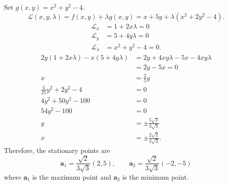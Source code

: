 \begin{solution}
    Set $g(x, y) = x^2 + y^2 - 4$.
    \[ \mathcal L(x, y, \lambda) = f(x, y) + \lambda g(x, y) =
    x + 5y + \lambda(x^2 + 2y^2 - 4). \]
    \begin{align*}
        \mathcal L_x       &= 1 + 2x\lambda = 0 \\
        \mathcal L_y       &= 5 + 4y\lambda = 0 \\
        \mathcal L_\lambda &= x^2 + y^2 - 4 = 0.
    \end{align*}
    \begin{align*}
        2y(1 + 2x\lambda) - x(5 + 4y\lambda) 
        &= 2y + 4xy\lambda - 5x - 4xy\lambda \\
        &= 2y - 5x = 0 \\ 
        x &= \frac25y \\
        \frac{4}{25}y^2 + 2y^2 - 4 &= 0 \\
        4y^2 + 50y^2 - 100 &= 0 \\
        54y^2 - 100 &= 0 \\
        y &= \pm \frac{5\sqrt2}{3\sqrt3} \\
        x &= \pm \frac{2\sqrt2}{3\sqrt3}.
    \end{align*}
    Therefore, the stationary points are
    \[ \bm a_1 = \frac{\sqrt2}{3\sqrt3}(2, 5), \qquad \bm a_2 = \frac{\sqrt2}{3\sqrt3}(-2, -5) \]
    where $\bm a_1$ is the maximum point and $\bm a_2$ is the minimum point.
\end{solution}
